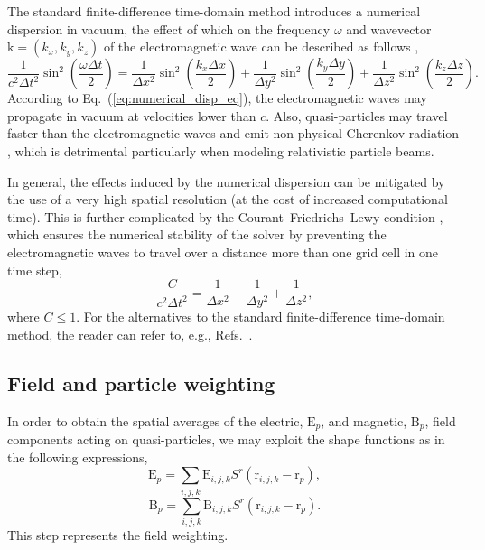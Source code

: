 \documentclass[10pt, a4paper, twoside, openright]{report}
\renewcommand{\vec}[1]{\boldsymbol{\mathrm{#1}}}
\begin{document}
The standard finite-difference time-domain method introduces a numerical dispersion in vacuum, the effect of which on the frequency $ \omega $ and wavevector $ \vec{k} = \left( k_x, k_y, k_z \right) $ of the electromagnetic wave can be described as follows \cite{Vay2011}, 
\begin{equation}\label{eq:numerical_disp_eq}
	\frac{1}{c^2 \Delta t^2} \sin^2 \left(\frac{\omega \Delta t}{2}\right) = \frac{1}{\Delta x^2} \sin^2 \left(\frac{k_x \Delta x}{2}\right) + \frac{1}{\Delta y^2} \sin^2 \left(\frac{k_y \Delta y}{2}\right) + \frac{1}{\Delta z^2} \sin^2 \left(\frac{k_z \Delta z}{2}\right).
\end{equation}
According to Eq.~(\ref{eq:numerical_disp_eq}), the electromagnetic waves may propagate in vacuum at velocities lower than $ c $. Also, quasi-particles may travel faster than the electromagnetic waves and emit non-physical Cherenkov radiation \cite{Godfrey1974}, which is detrimental particularly when modeling relativistic particle beams. 

In general, the effects induced by the numerical dispersion can be mitigated by the use of a very high spatial resolution (at the cost of increased computational time). This is further complicated by the Courant--Friedrichs--Lewy condition \cite{Courant1928}, which ensures the numerical stability of the solver by preventing the electromagnetic waves to travel over a distance more than one grid cell in one time step,
\begin{equation}\label{eq:cfl}
	\frac{C}{c^{2} \Delta t^{2}} = \frac{1}{\Delta x^{2}} + \frac{1}{\Delta y^{2}} + \frac{1}{\Delta z^{2}},
\end{equation}
where $ C \leq 1 $. For the alternatives to the standard finite-difference time-domain method, the reader can refer to, e.g., Refs.~.

\subsection{Field and particle weighting}

In order to obtain the spatial averages of the electric, $ \vec{E}_{p} $, and magnetic, $ \vec{B}_{p} $, field components acting on quasi-particles, we may exploit the shape functions as in the following expressions,
\begin{equation}\label{eq:E_weighting}
	\vec{E}_{p} = \sum_{i, j, k} \vec{E}_{i, j, k} S^r \left( \vec{r}_{i, j, k} - \vec{r}_{p} \right),
\end{equation}
\begin{equation}\label{eq:B_weighting}
	\vec{B}_{p} = \sum_{i, j, k} \vec{B}_{i, j, k} S^r \left( \vec{r}_{i, j, k} - \vec{r}_{p} \right).
\end{equation}
This step represents the field weighting.
\end{document}
